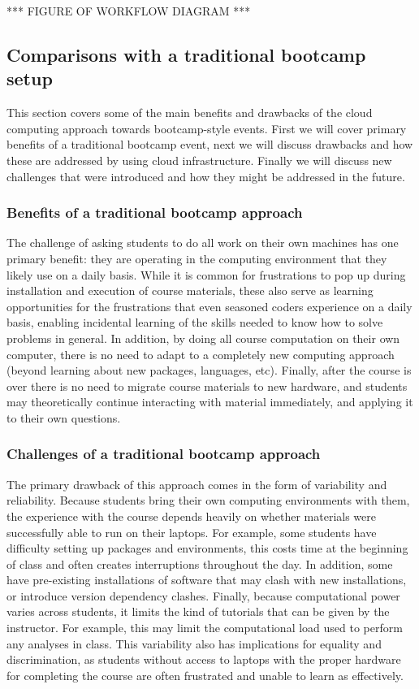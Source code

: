 *** FIGURE OF WORKFLOW DIAGRAM ***

\subsection{Comparisons with a traditional bootcamp setup}

This section covers some of the main benefits and drawbacks of the cloud
computing approach towards bootcamp-style events. First we will cover primary
benefits of a traditional bootcamp event, next we will discuss drawbacks and how
these are addressed by using cloud infrastructure. Finally we will discuss new
challenges that were introduced and how they might be addressed in the future.

\subsubsection{Benefits of a traditional bootcamp approach}

The challenge of asking students to do all work on their own machines has one
primary benefit: they are operating in the computing environment that they
likely use on a daily basis. While it is common for frustrations to pop up
during installation and execution of course materials, these also serve as
learning opportunities for the frustrations that even seasoned coders experience
on a daily basis, enabling incidental learning of the skills needed to know how
to solve problems in general. In addition, by doing all course computation on
their own computer, there is no need to adapt to a completely new computing
approach (beyond learning about new packages, languages, etc). Finally, after
the course is over there is no need to migrate course materials to new hardware,
and students may theoretically continue interacting with material immediately,
and applying it to their own questions.

\subsubsection{Challenges of a traditional bootcamp approach}

The primary drawback of this approach comes in the form of variability and
reliability. Because students bring their own computing environments with them,
the experience with the course depends heavily on whether materials were
successfully able to run on their laptops. For example, some students have
difficulty setting up packages and environments, this costs time at the
beginning of class and often creates interruptions throughout the day. In
addition, some have pre-existing installations of software that may clash with
new installations, or introduce version dependency clashes. Finally, because
computational power varies across students, it limits the kind of tutorials that
can be given by the instructor. For example, this may limit the computational
load used to perform any analyses in class. This variability also has
implications for equality and discrimination, as students without access to
laptops with the proper hardware for completing the course are often frustrated
and unable to learn as effectively.

